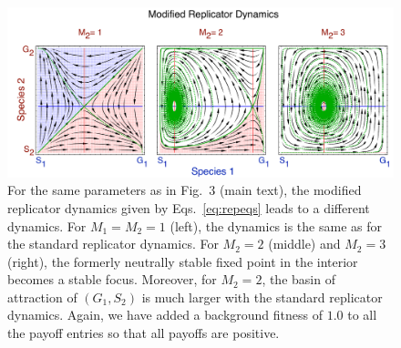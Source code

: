 \documentclass[aps,pre,amsfonts,floatfix, onecolumn,showkeys]{revtex4-1}
\begin{document}
\begin{figure}
\begin{center}
\includegraphics[width=\linewidth]{modifiedrepdyn}
\end{center}
\caption{
For the same parameters as in Fig.\ 3 (main text), the modified replicator dynamics given by Eqs.\ \ref{eq:repeqs} leads to a different dynamics.
For $M_1=M_2=1$ (left), the dynamics is the same as for the standard replicator dynamics. 
For $M_2=2$ (middle) and $M_2=3$ (right), the formerly neutrally stable fixed point in the interior becomes a stable focus. 
Moreover, for $M_2=2$, the basin of attraction of $(G_1,S_2)$ is much larger with the standard replicator dynamics. 
Again, we have added a background fitness of $1.0$ to all the payoff entries so that all payoffs are positive.}
\label{fig:thresholdsmodrep}
\end{figure}
\end{document}

